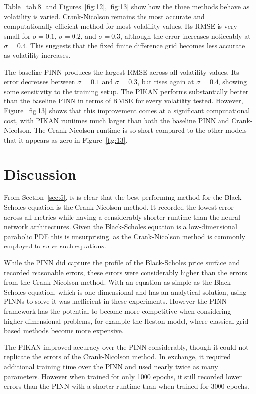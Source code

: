 \documentclass[11pt,a4paper]{article}
\begin{document}
Table~\ref{tab:8} and Figures~\ref{fig:12}, \ref{fig:13} show how the three methods behave as volatility is varied. Crank-Nicolson remains the most accurate and computationally efficient method for most volatility values. Its RMSE is very small for $\sigma=0.1$, $\sigma=0.2$, and $\sigma=0.3$, although the error increases noticeably at $\sigma=0.4$. This suggests that the fixed finite difference grid becomes less accurate as volatility increases.

The baseline PINN produces the largest RMSE across all volatility values. Its error decreases between $\sigma=0.1$ and $\sigma=0.3$, but rises again at $\sigma=0.4$, showing some sensitivity to the training setup. The PIKAN performs substantially better than the baseline PINN in terms of RMSE for every volatility tested. However, Figure~\ref{fig:13} shows that this improvement comes at a significant computational cost, with PIKAN runtimes much larger than both the baseline PINN and Crank-Nicolson. The Crank-Nicolson runtime is so short compared to the other models that it appears as zero in Figure~\ref{fig:13}.

\section{Discussion}

From Section~\ref{sec:5}, it is clear that the best performing method for the Black-Scholes equation is the Crank-Nicolson method. It recorded the lowest error across all metrics while having a considerably shorter runtime than the neural network architectures. Given the Black-Scholes equation is a low-dimensional parabolic PDE this is unsurprising, as the Crank-Nicolson method is commonly employed to solve such equations.

While the PINN did capture the profile of the Black-Scholes price surface and recorded reasonable errors, these errors were considerably higher than the errors from the Crank-Nicolson method. With an equation as simple as the Black-Scholes equation, which is one-dimensional and has an analytical solution, using PINNs to solve it was inefficient in these experiments. However the PINN framework has the potential to become more competitive when considering higher-dimensional problems, for example the Heston model, where classical grid-based methods become more expensive.

The PIKAN improved accuracy over the PINN considerably, though it could not replicate the errors of the Crank-Nicolson method. In exchange, it required additional training time over the PINN and used nearly twice as many parameters. However when trained for only 1000 epochs, it still recorded lower errors than the PINN with a shorter runtime than when trained for 3000 epochs.
\end{document}
